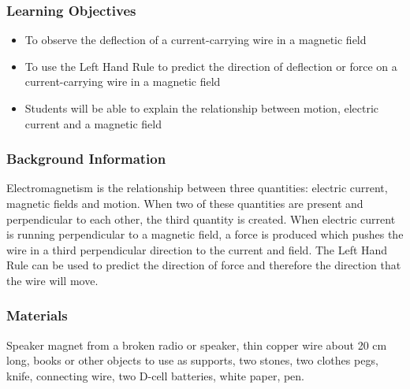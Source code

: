\subsubsection*{Learning Objectives}
\begin{itemize}
\item{To observe the deflection of a current-carrying wire in a magnetic field} 
\item{To use the Left Hand Rule to predict the direction of deflection or force on a current-carrying wire in a magnetic field} 
\item{Students will be able to explain the relationship between motion, electric current and a magnetic field}
\end{itemize}

\subsubsection*{Background Information}
Electromagnetism is the relationship between three quantities: electric current, magnetic fields and motion. When two of these quantities are present and perpendicular to each other, the third quantity is created. When electric current is running perpendicular to a magnetic field, a force is produced which pushes the wire in a third perpendicular direction to the current and field. The Left Hand Rule can be used to predict the direction of force and therefore the direction that the wire will move.  

\subsubsection*{Materials}
Speaker magnet from a broken radio or speaker, thin copper wire about 20 cm long, books or other objects to use as supports, two stones, two clothes pegs, knife, connecting wire, two D-cell batteries, white paper, pen.  

